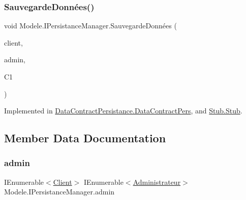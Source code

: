 \subsubsection{\texorpdfstring{Sauvegarde\+Données()}{SauvegardeDonnées()}}
{\footnotesize\ttfamily void Modele.\+I\+Persistance\+Manager.\+Sauvegarde\+Données (\begin{DoxyParamCaption}\item[{I\+Enumerable$<$ \hyperlink{classModele_1_1Client}{Client} $>$}]{client,  }\item[{I\+Enumerable$<$ \hyperlink{classModele_1_1Administrateur}{Administrateur} $>$}]{admin,  }\item[{\hyperlink{classModele_1_1Catalogue}{Catalogue}}]{C1 }\end{DoxyParamCaption})}



Implemented in \hyperlink{classDataContractPersistance_1_1DataContractPers_aa2ef70839fd63f14fab9aca02bd42528}{Data\+Contract\+Persistance.\+Data\+Contract\+Pers}, and \hyperlink{classStub_1_1Stub_a3c4b4543b0e2b6cc5915be0ebf537b2e}{Stub.\+Stub}.



\subsection{Member Data Documentation}
\mbox{\label{interfaceModele_1_1IPersistanceManager_a4613622305c67836114ec254f6a21337}} 
\subsubsection{\texorpdfstring{admin}{admin}}
{\footnotesize\ttfamily I\+Enumerable$<$\hyperlink{classModele_1_1Client}{Client}$>$ I\+Enumerable$<$\hyperlink{classModele_1_1Administrateur}{Administrateur}$>$ Modele.\+I\+Persistance\+Manager.\+admin}

\mbox{\label{interfaceModele_1_1IPersistanceManager_a0f7ffabee613173cb4de6362f9d946b0}} 
